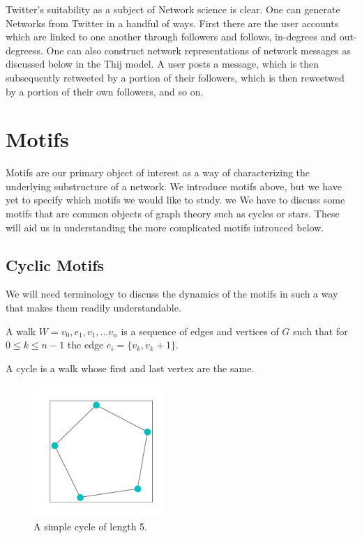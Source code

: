 Twitter's suitability as a subject of Network science is clear. One can generate Networks from Twitter 
in a handful of ways. First there are the user accounts which are linked to one another through 
followers and follows, in-degrees and out-degreess. One can also construct network representations 
of network messages as discussed below in the Thij model. A user posts a message, which is then subsequently 
retweeted by a portion of their followers, which is then reweetwed by a portion of their own followers, and 
so on.

\chapter{Motifs}

Motifs are our primary object of interest as a way of characterizing the underlying substructure of a
network. We introduce motifs above, but we have yet to specify which motifs we would like to study. we
We have to discuss some motifs that are common objects of graph theory such as cycles or stars. These
will aid us in understanding the more complicated motifs introuced below. 


\section{Cyclic Motifs}

We will need terminology to discuss the dynamics of the motifs in such a way that 
makes them readily understandable. 

\begin{dfn}
    A walk $W = {v_0, e_1, v_1, \dots v_n}$ is a sequence of edges and vertices of $G$ such that
    for $0 \leq k \leq n-1$ the edge $e_i = \{v_k, v_k+1\}$.
\end{dfn}

\begin{dfn}
    A cycle is a walk whose first and last vertex are the same.
\end{dfn}

\begin{figure}[h!]
    \includegraphics[width=5cm]{Images/Cycle.png}
    \centering
    \caption{A simple cycle of length 5.}
\end{figure}

